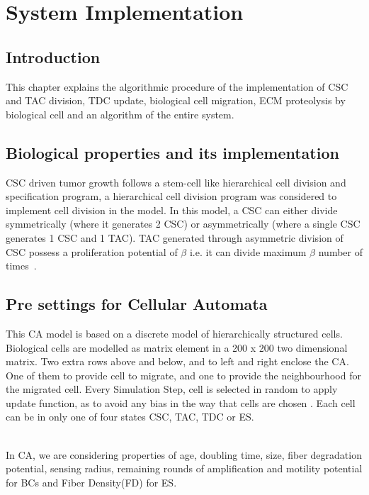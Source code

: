 \chapter{System Implementation}

\section{Introduction}
This chapter explains the algorithmic procedure of the implementation of CSC and TAC division, TDC update, biological cell migration, 
ECM proteolysis by biological cell and an algorithm of the entire system.

\section{Biological properties and its implementation}
CSC driven tumor growth follows a stem-cell like hierarchical cell division and specification program, 
a hierarchical cell division program was considered to implement cell division in the model. 
In this  model, a CSC can either divide symmetrically (where it generates 2 CSC) or asymmetrically (where a single CSC generates 1 CSC and 1 TAC). 
TAC generated  through asymmetric division of CSC possess a proliferation potential of $\beta$ i.e. 
it can divide maximum $\beta$ number of times~\cite{poleszczuk2015}. 

\section{Pre settings for Cellular Automata}

This CA model is based on a discrete model of hierarchically structured cells.
Biological cells are modelled as matrix element in a 200 x 200 two dimensional matrix.
Two extra rows above and below, and to left and right enclose the CA. 
One of them to provide cell to migrate, and one to provide the neighbourhood for the migrated cell.
Every Simulation Step, cell is selected in random to apply update function, as to avoid any bias in the way that cells are chosen \cite{MicroenvironmentalVariables}.
Each cell can be in only one of four states CSC, TAC, TDC or ES.

~\\In CA, we are considering properties of age, doubling time, size, fiber degradation potential, sensing radius, remaining rounds of amplification and motility potential for BCs
and Fiber Density(FD) for ES.

